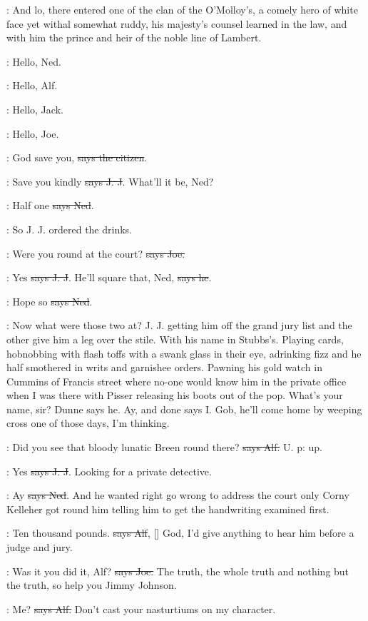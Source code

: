 :
And lo, there entered one of the clan of the O'Molloy's, a comely hero
of white face yet withal somewhat ruddy, his majesty's counsel learned in
the law, and with him the prince and heir of the noble line of Lambert.

\bergan:
Hello, Ned.

\lambert:
Hello, Alf.

\joe:
Hello, Jack.

\jjom:
Hello, Joe.

\citizen:
God save you, \sout{says the citizen}.

\jjom:
Save you kindly \sout{says J. J}.
What'll it be, Ned?

\lambert:
Half one \sout{says Ned}.

\Nq:
So J. J. ordered the drinks.

\joe:
Were you round at the court? \sout{says Joe.}

\jjom:
Yes \sout{says J. J}.
He'll square that, Ned, \sout{says he}.

\lambert:
Hope so \sout{says Ned}.

\Nq:
Now what were those two at? J. J. getting him off the grand jury list
and the other give him a leg over the stile. With his name in Stubbs's.
Playing cards, hobnobbing with flash toffs with a swank glass in their
eye, adrinking fizz and he half smothered in writs and garnishee orders.
Pawning his gold watch in Cummins of Francis street where no-one would
know him in the private office when I was there with Pisser releasing his
boots out of the pop. What's your name, sir? Dunne says he. Ay, and done
says I. Gob, he'll come home by weeping cross one of those days, I'm
thinking.

\bergan:
Did you see that bloody lunatic Breen round there?
\sout{says Alf.} U. p: up.

\jjom:
Yes \sout{says J. J}.
Looking for a private detective.

\lambert:
Ay \sout{says Ned}.
And he wanted right go wrong to address the court only
Corny Kelleher got round him telling him to get the handwriting examined
first.

\bergan:
Ten thousand pounds. \sout{says Alf},
[]
God, I'd give anything to hear
him before a judge and jury.

\joe:
Was it you did it, Alf? \sout{says Joe.}
The truth, the whole truth and nothing
but the truth, so help you Jimmy Johnson.

\bergan:
Me? \sout{says Alf.}
Don't cast your nasturtiums on my character.

